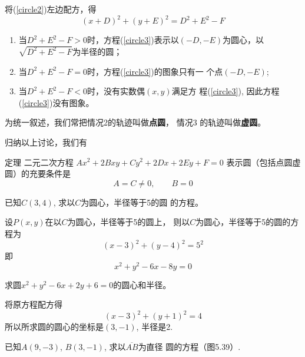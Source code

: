 将(\ref{circle2})左边配方，得
\begin{equation}\label{circle3}
    (x+D)^2+(y+E)^2=D^2+E^2-F
\end{equation}

\begin{enumerate}
\item 当$D^2+E^2-F>0$时，方程(\ref{circle3})表示以$(-D,
-E)$为圆心，以$\sqrt{D^2+E^2-F}$为半径的圆；
\item 当$D^2+E^2-F=0$时，方程(\ref{circle3})的图象只有一
个点$(-D,-E)$;
\item 当$D^2+E^2-F<0$时，没有实数偶$(x,y)$满足方
程(\ref{circle3}), 因此方程(\ref{circle3})没有图象。
\end{enumerate}

为统一叙述，我们常把情况2的轨迹叫做\textbf{点圆}，
情况3
的轨迹叫做\textbf{虚圆}。

归纳以上讨论，我们有

\begin{blk}
   {定理} 二元二次方程
$Ax^2+2Bxy+Cy^2+2Dx+2Ey+F=0$
表示圆（包括点圆虚圆）的充要条件是
\[A=C\ne 0,\qquad B=0\] 
\end{blk}

\begin{example}
    已知$C(3,4)$, 求以$C$为圆心，半径等于5的圆
的方程。
\end{example}

\begin{solution}
设$P(x,y)$在以$C$为圆心，半径等于5的圆上，
则以$C$为圆心，半径等于5的圆的方程为
\[(x-3)^2+(y-4)^2=5^2\]
即
\[x^2+y^2-6x-8y=0\]
\end{solution}

\begin{example}
    求圆$x^2+y^2-6x+2y+6=0$的圆心和半径。
\end{example}

\begin{solution}
    将原方程配方得
\[(x-3)^2+(y+1)^2=4\]
所以所求圆的圆心的坐标是$(3,-1)$, 半径是2.
\end{solution}

\begin{example}
    已知$A(9,-3)$, $B(3,-1)$, 求以$\overline{AB}$为直径
圆的方程（图5.39）.
\end{example}

\begin{figure}[htp]
    \centering
{}   
    \caption{}
\end{figure}


